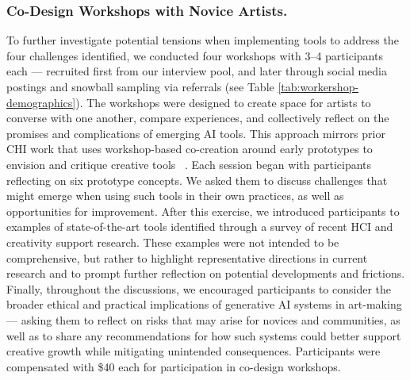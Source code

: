 \subsubsection{Co-Design Workshops with Novice Artists.}
To further investigate potential tensions when implementing tools to address the four challenges identified, we conducted four workshops with 3–4 participants each --- recruited first from our interview pool, and later through social media postings and snowball sampling via referrals (see Table \ref{tab:workershop-demographics}). The workshops were designed to create space for artists to converse with one another, compare experiences, and collectively reflect on the promises and complications of emerging AI tools. This approach mirrors prior CHI work that uses workshop-based co-creation around early prototypes to envision and critique creative tools ~\cite{muller1993participatory}. Each session began with participants reflecting on six prototype concepts. We asked them to discuss challenges that might emerge when using such tools in their own practices, as well as opportunities for improvement. After this exercise, we introduced participants to examples of state-of-the-art tools identified through a survey of recent HCI and creativity support research.
These examples were not intended to be comprehensive, but rather to highlight representative directions in current research and to prompt further reflection on potential developments and frictions. Finally, throughout the discussions, we encouraged participants to consider the broader ethical and practical implications of generative AI systems in art-making --- asking them to reflect on risks that may arise for novices and communities, as well as to share any recommendations for how such systems could better support creative growth while mitigating unintended consequences. Participants were compensated with \$40 each for participation in co-design workshops.


